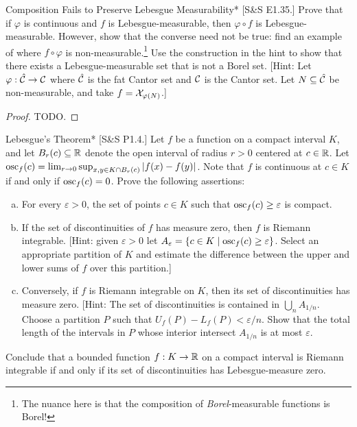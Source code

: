 \begin{problem}{Composition Fails to Preserve Lebesgue Measurability}*
    [S\&S E1.35.] Prove that if \(\varphi\) is continuous and \(f\) is Lebesgue-measurable, then \(\varphi \circ f\) is Lebesgue-measurable. However, show that the converse need not be true: find an example of where \(f \circ \varphi\) is non-measurable.\footnote{The nuance here is that the composition of \textit{Borel}-measurable functions is Borel!} Use the construction in the hint to show that there exists a Lebesgue-measurable set that is not a Borel set. 
    [Hint: Let \(\varphi : \hat{\mathcal{C}} \to \mathcal{C}\) where \(\hat{\mathcal{C}}\) is the fat Cantor set and \(\mathcal{C}\) is the Cantor set. Let \(N \subseteq \hat{\mathcal{C}}\) be non-measurable, and take \(f = \mathcal{X}_{\varphi(N)}\).]
\end{problem}

\begin{proof}
    TODO. 
\end{proof}

\begin{problem}{Lebesgue's Theorem}*
    [S\&S P1.4.] Let \(f\) be a  function on a compact interval \(K\), and let \(B_r(c) \subseteq \mathbb{R}\) denote the open interval of radius \(r > 0\) centered at \(c \in \mathbb{R}\). Let \(\operatorname{osc}_f(c) = \lim_{r \to 0} \sup_{x, y \in K \cap B_r(c)}|f(x) - f(y)|\). Note that \(f\) is continuous at \(c \in K\) if and only if \(\operatorname{osc}_f(c) = 0\). Prove the following assertions:
    \begin{enumerate}[(a)]
        \itemsep0em
        \item For every \(\varepsilon > 0\), the set of points \(c \in K\) such that \(\operatorname{osc}_f(c) \geq \varepsilon\) is compact. 
        \item If the set of discontinuities of \(f\) has measure zero, then \(f\) is Riemann integrable. [Hint: given \(\varepsilon > 0\) let \(A_\varepsilon = \{c \in K \mid \operatorname{osc}_f(c) \geq \varepsilon \}\). Select an appropriate partition of \(K\) and estimate the difference between the upper and lower sums of \(f\) over this partition.]
        \item Conversely, if \(f\) is Riemann integrable on \(K\), then its set of discontinuities has measure zero. [Hint: The set of discontinuities is contained in \(\bigcup_n A_{1/n}\). Choose a partition \(P\) such that \(U_f(P) - L_f(P) < \varepsilon / n\). Show that the total length of the intervals in \(P\) whose interior intersect \(A_{1/n}\) is at most \(\varepsilon\). 
    \end{enumerate}

    Conclude that a bounded function \(f : K \to \mathbb{R}\) on a compact interval is Riemann integrable if and only if its set of discontinuities has Lebesgue-measure zero. 
\end{problem}

